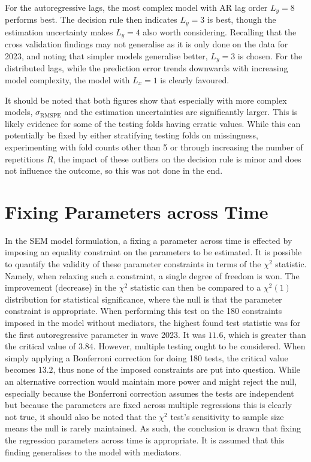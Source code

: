 For the autoregressive lags, the most complex model with AR lag order $L_y = 8$ performs best. The decision rule
then indicates $L_y = 3$ is best, though the estimation uncertainty makes $L_y = 4$ also worth considering.
Recalling that the cross validation findings may not generalise as it is only done on the data for 2023, and noting that
simpler models generalise better, $L_y = 3$ is chosen.
For the distributed lags, while the prediction error trends downwards with increasing model complexity,
the model with $L_x = 1$ is clearly favoured.

It should be noted that both figures show that especially with more complex models, $\sigma_{\text{RMSPE}}$ and the estimation uncertainties
are significantly larger. This is likely evidence for some of the testing folds having erratic values.
While this can potentially be fixed by either stratifying testing folds on missingness,
experimenting with fold counts other than 5 or through increasing the number of repetitions $R$,
the impact of these outliers on the decision rule is minor and does not influence the outcome, so this was not done
in the end.

\section{Fixing Parameters across Time}
\label{sec:modelling:parameter_fixing}
In the SEM model formulation, a fixing a parameter across time is effected by imposing an equality constraint on the
parameters to be estimated.
It is possible to quantify the validity of these parameter constraints in terms of the $\chi^2$ statistic.
Namely, when relaxing such a constraint, a single degree of freedom is won. The improvement (decrease) in the $\chi^2$
statistic can then be compared to a $\chi^2(1)$ distribution for statistical significance, where the null is
that the parameter constraint is appropriate.
When performing this test on the 180 constraints imposed in the model without mediators, the highest found test
statistic was for the first autoregressive parameter in wave 2023. It was $11.6$, which is greater than the critical
value of $3.84$. However, multiple testing ought to be considered.
When simply applying a Bonferroni correction for doing 180 tests, the critical value becomes $13.2$, thus none of the
imposed constraints are put into question.
While an alternative correction would maintain more power and might reject the null, especially because
the Bonferroni correction assumes the tests are independent but because the parameters are fixed across multiple
regressions this is clearly not true, it should also be noted that
the $\chi^2$ test's sensitivity to sample size means the null is rarely maintained. As such, the conclusion is drawn
that fixing the regression parameters across time is appropriate.
It is assumed that this finding generalises to the model with mediators.

